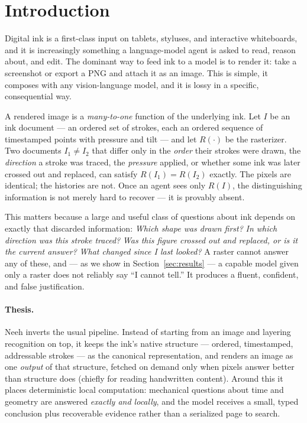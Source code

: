 \documentclass[11pt]{article}
\begin{document}
\section{Introduction}

Digital ink is a first-class input on tablets, styluses, and interactive
whiteboards, and it is increasingly something a language-model agent is asked to
read, reason about, and edit. The dominant way to feed ink to a model is to
render it: take a screenshot or export a PNG and attach it as an image. This is
simple, it composes with any vision-language model, and it is lossy in a
specific, consequential way.

A rendered image is a \emph{many-to-one} function of the underlying ink. Let
$I$ be an ink document --- an ordered set of strokes, each an ordered sequence
of timestamped points with pressure and tilt --- and let $R(\cdot)$ be the
rasterizer. Two documents $I_1 \neq I_2$ that differ only in the \emph{order}
their strokes were drawn, the \emph{direction} a stroke was traced, the
\emph{pressure} applied, or whether some ink was later crossed out and replaced,
can satisfy $R(I_1) = R(I_2)$ exactly. The pixels are identical; the histories
are not. Once an agent sees only $R(I)$, the distinguishing information is not
merely hard to recover --- it is provably absent.

This matters because a large and useful class of questions about ink depends on
exactly that discarded information: \emph{Which shape was drawn first?} \emph{In
which direction was this stroke traced?} \emph{Was this figure crossed out and
replaced, or is it the current answer?} \emph{What changed since I last looked?}
A raster cannot answer any of these, and --- as we show in
Section~\ref{sec:results} --- a capable model given only a raster does not
reliably say ``I cannot tell.'' It produces a fluent, confident, and false
justification.

\paragraph{Thesis.} Neeh inverts the usual pipeline. Instead of starting from an
image and layering recognition on top, it keeps the ink's native structure ---
ordered, timestamped, addressable strokes --- as the canonical representation,
and renders an image as one \emph{output} of that structure, fetched on demand
only when pixels answer better than structure does (chiefly for reading
handwritten content). Around this it places deterministic local computation:
mechanical questions about time and geometry are answered \emph{exactly and
locally}, and the model receives a small, typed conclusion plus recoverable
evidence rather than a serialized page to search.
\end{document}

